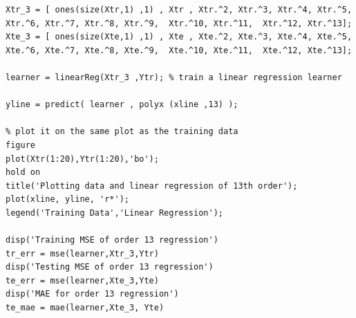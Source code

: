\documentclass{article}
\begin{document}
\begin{verbatim}
Xtr_3 = [ ones(size(Xtr,1) ,1) , Xtr , Xtr.^2, Xtr.^3, Xtr.^4, Xtr.^5, Xtr.^6, Xtr.^7, Xtr.^8, Xtr.^9,  Xtr.^10, Xtr.^11,  Xtr.^12, Xtr.^13];
Xte_3 = [ ones(size(Xte,1) ,1) , Xte , Xte.^2, Xte.^3, Xte.^4, Xte.^5, Xte.^6, Xte.^7, Xte.^8, Xte.^9,  Xte.^10, Xte.^11,  Xte.^12, Xte.^13];

learner = linearReg(Xtr_3 ,Ytr); % train a linear regression learner

yline = predict( learner , polyx (xline ,13) );

% plot it on the same plot as the training data
figure
plot(Xtr(1:20),Ytr(1:20),'bo');
hold on
title('Plotting data and linear regression of 13th order');
plot(xline, yline, 'r*');
legend('Training Data','Linear Regression');

disp('Training MSE of order 13 regression')
tr_err = mse(learner,Xtr_3,Ytr)
disp('Testing MSE of order 13 regression')
te_err = mse(learner,Xte_3,Yte)
disp('MAE for order 13 regression')
te_mae = mae(learner,Xte_3, Yte)
\end{verbatim}
\end{document}
